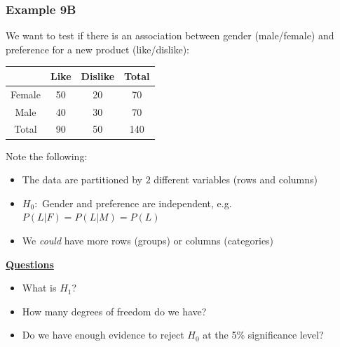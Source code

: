 \documentclass[t,8pt]{beamer}
\begin{document}
\begin{frame}
	\frametitle{Example 9B}
	We want to test if there is an association between gender (male/female) and preference for a new product (like/dislike):
	\begin{center}
		\begin{tabular}{ c | c  c | c }
			& Like & Dislike & Total \\ \hline
			Female & 50 & 20 & 70 \\ 
			Male & 40 & 30 & 70 \\ \hline
			Total & 90 & 50 & 140
		\end{tabular} 
	\end{center}%
	Note the following:
	\begin{itemize}
		\item The data are partitioned by $2$ different variables (rows and columns)
		\item $H_0:$ Gender and preference are independent, e.g. $P(L\vert F)=P(L\vert M)=P(L)$
		\item We {\it could} have more rows (groups) or columns (categories)
	\end{itemize}
	{\bf\underline{Questions}} \par
	\begin{itemize}
		\item What is $H_1$?
		\item How many degrees of freedom do we have?
		\item Do we have enough evidence to reject $H_0$ at the 5\% significance level?
	\end{itemize}
\end{frame}
\end{document}
